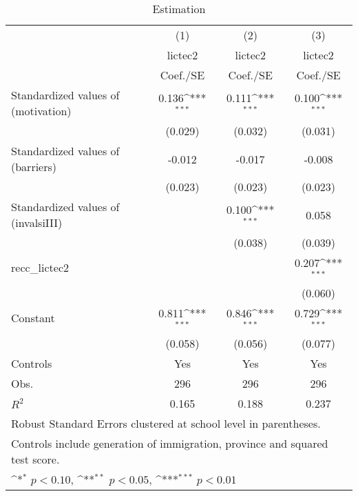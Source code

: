 \begin{table}[htbp]\centering
\def\sym#1{\ifmmode^{#1}\else\(^{#1}\)\fi}
\caption{Estimation \label{Table6a}}
\begin{tabular}{l*{3}{c}}
\toprule
                    &\multicolumn{1}{c}{(1)}&\multicolumn{1}{c}{(2)}&\multicolumn{1}{c}{(3)}\\
                    &\multicolumn{1}{c}{lictec2}&\multicolumn{1}{c}{lictec2}&\multicolumn{1}{c}{lictec2}\\
                    &    Coef./SE         &    Coef./SE         &    Coef./SE         \\
\midrule
Standardized values of (motivation)     &       0.136\sym{***}&       0.111\sym{***}&       0.100\sym{***}\\
                    &     (0.029)         &     (0.032)         &     (0.031)         \\
Standardized values of (barriers)     &      -0.012         &      -0.017         &      -0.008         \\
                    &     (0.023)         &     (0.023)         &     (0.023)         \\
Standardized values of (invalsiIII)     &                     &       0.100\sym{***}&       0.058         \\
                    &                     &     (0.038)         &     (0.039)         \\
recc\_lictec2        &                     &                     &       0.207\sym{***}\\
                    &                     &                     &     (0.060)         \\
Constant            &       0.811\sym{***}&       0.846\sym{***}&       0.729\sym{***}\\
                    &     (0.058)         &     (0.056)         &     (0.077)         \\
Controls            &         Yes         &         Yes         &         Yes         \\
\midrule
Obs.                &         296         &         296         &         296         \\
\(R^{2}\)           &       0.165         &       0.188         &       0.237         \\
\bottomrule
\multicolumn{4}{l}{\footnotesize Robust Standard Errors clustered at school level in parentheses.}\\
\multicolumn{4}{l}{\footnotesize Controls include generation of immigration, province and squared test score.}\\
\multicolumn{4}{l}{\footnotesize \sym{*} \(p<0.10\), \sym{**} \(p<0.05\), \sym{***} \(p<0.01\)}\\
\end{tabular}
\end{table}
